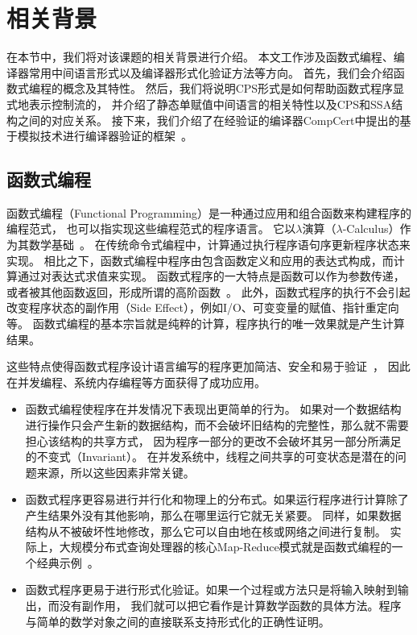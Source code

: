 \section{相关背景} \label{sec:background}

在本节中，我们将对该课题的相关背景进行介绍。
本文工作涉及函数式编程、编译器常用中间语言形式以及编译器形式化验证方法等方向。
首先，我们会介绍函数式编程的概念及其特性。
然后，我们将说明CPS形式是如何帮助函数式程序显式地表示控制流的，
并介绍了静态单赋值中间语言的相关特性以及CPS和SSA结构之间的对应关系。
接下来，我们介绍了在经验证的编译器CompCert中提出的基于模拟技术进行编译器验证的框架~\cite{leroy2009formally}。

\subsection{函数式编程}

函数式编程（Functional Programming）是一种通过应用和组合函数来构建程序的编程范式，
也可以指实现这些编程范式的程序语言。
它以$\lambda$演算（$\lambda$-Calculus）作为其数学基础~\cite{church1985calculi,MILNER19771}。
在传统命令式编程中，计算通过执行程序语句序更新程序状态来实现。
相比之下，函数式编程中程序由包含函数定义和应用的表达式构成，而计算通过对表达式求值来实现。
函数式程序的一大特点是函数可以作为参数传递，或者被其他函数返回，形成所谓的高阶函数~\cite{sussman1998scheme}。
此外，函数式程序的执行不会引起改变程序状态的副作用（Side Effect），例如I/O、可变变量的赋值、指针重定向等。
函数式编程的基本宗旨就是纯粹的计算，程序执行的唯一效果就是产生计算结果。

这些特点使得函数式程序设计语言编写的程序更加简洁、安全和易于验证~\cite{hudak1989conception}，
因此在并发编程、系统内存编程等方面获得了成功应用。
\begin{itemize}
    \item 函数式编程使程序在并发情况下表现出更简单的行为。
    如果对一个数据结构进行操作只会产生新的数据结构，而不会破坏旧结构的完整性，那么就不需要担心该结构的共享方式，
    因为程序一部分的更改不会破坏其另一部分所满足的不变式（Invariant）。
    在并发系统中，线程之间共享的可变状态是潜在的问题来源，所以这些因素非常关键。
    \item 函数式程序更容易进行并行化和物理上的分布式。如果运行程序进行计算除了产生结果外没有其他影响，那么在哪里运行它就无关紧要。
    同样，如果数据结构从不被破坏性地修改，那么它可以自由地在核或网络之间进行复制。
    实际上，大规模分布式查询处理器的核心Map-Reduce模式就是函数式编程的一个经典示例~\cite{chu2006map}。
    \item 函数式程序更易于进行形式化验证。如果一个过程或方法只是将输入映射到输出，而没有副作用，
    我们就可以把它看作是计算数学函数的具体方法。程序与简单的数学对象之间的直接联系支持形式化的正确性证明。
\end{itemize}


